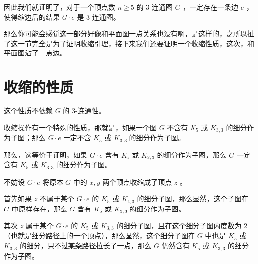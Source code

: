 \documentclass[11pt, a4paper]{ctexart}
\begin{document}
因此我们就证明了，对于一个顶点数 $n\ge 5$ 的 3-连通图 $G$ ，一定存在一条边 $e$ ，使得缩边后的结果 $G\cdot e$ 是 3-连通图。

那么你可能会感觉这一部分好像和平面图一点关系也没有啊，是这样的，之所以扯了这一节完全是为了证明收缩引理，接下来我们还要证明一个收缩性质，这次，和平面图沾了一点边。

\section{收缩的性质}
这个性质不依赖 $G$ 的 3-连通性。

收缩操作有一个特殊的性质，那就是，如果一个图 $G$ 不含有 $K_{5}$ 或 $K_{3,3}$ 的细分作为子图；那么 $G\cdot e$ 一定不含 $K_{5}$ 或 $K_{3,3}$ 的细分作为子图。

那么，这等价于证明，如果 $G\cdot e$ 含有 $K_{5}$ 或 $K_{3,3}$ 的细分作为子图，那么 $G$ 一定含有 $K_{5}$ 或 $K_{3,3}$ 的细分作为子图。

不妨设 $G\cdot e$ 将原本 $G$ 中的 $x,y$ 两个顶点收缩成了顶点 $z$ 。

首先如果 $z$ 不属于某个 $G\cdot e$ 的 $K_{5}$ 或 $K_{3,3}$ 的细分子图，那么显然，这个子图在 $G$ 中原样存在，那么 $G$ 含有 $K_{5}$ 或 $K_{3,3}$ 的细分作为子图。

其次 $z$ 属于某个 $G\cdot e$ 的 $K_{5}$ 或 $K_{3,3}$ 的细分子图，且在这个细分子图内度数为 2（也就是细分路径上的一个顶点），那么显然，这个细分子图在 $G$ 中也是 $K_{5}$ 或 $K_{3,3}$ 的细分，只不过某条路径拉长了一点，那么 $G$ 仍然含有 $K_{5}$ 或 $K_{3,3}$ 的细分作为子图。
\end{document}
